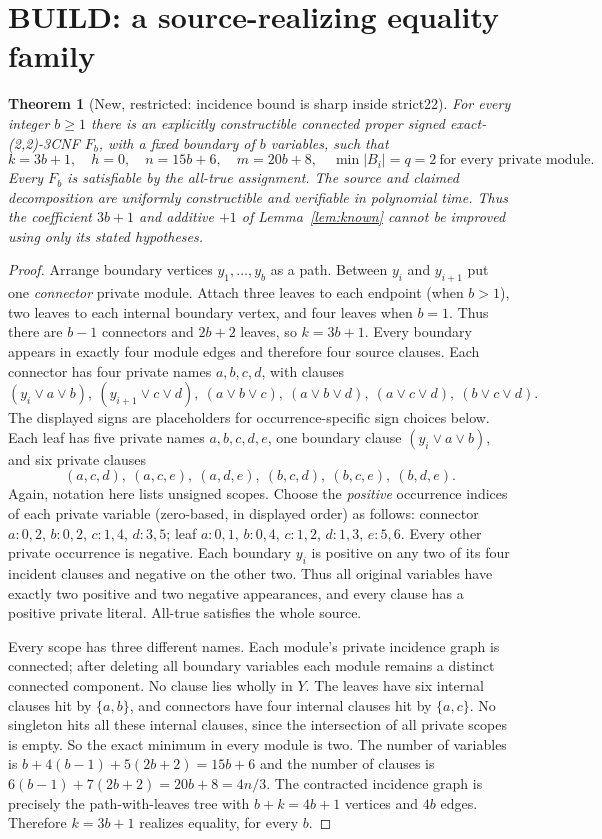 \documentclass[11pt]{article}
\newtheorem{theorem}{Theorem}
\begin{document}
\section{BUILD: a source-realizing equality family}
\begin{theorem}[New, restricted: incidence bound is sharp inside strict22]\label{thm:sharp}
For every integer $b\ge1$ there is an explicitly constructible connected proper signed exact-(2,2)-3CNF $F_b$, with a fixed boundary of $b$ variables, such that
\[
 k=3b+1,\quad h=0,\quad n=15b+6,\quad m=20b+8,
 \quad\min |B_i|=q=2\ \text{for every private module.}\]
Every $F_b$ is satisfiable by the all-true assignment. The source and claimed decomposition are uniformly constructible and verifiable in polynomial time. Thus the coefficient $3b+1$ and additive $+1$ of Lemma~\ref{lem:known} cannot be improved using only its stated hypotheses.
\end{theorem}
\begin{proof}
Arrange boundary vertices $y_1,\ldots,y_b$ as a path. Between $y_i$ and $y_{i+1}$ put one \emph{connector} private module. Attach three leaves to each endpoint (when $b>1$), two leaves to each internal boundary vertex, and four leaves when $b=1$. Thus there are $b-1$ connectors and $2b+2$ leaves, so $k=3b+1$. Every boundary appears in exactly four module edges and therefore four source clauses. Each connector has four private names $a,b,c,d$, with clauses
\[
(y_i\vee a\vee b),\ (y_{i+1}\vee c\vee d),\
(a\vee b\vee c),\ (a\vee b\vee d),\ (a\vee c\vee d),\ (b\vee c\vee d).
\]
The displayed signs are placeholders for occurrence-specific sign choices below. Each leaf has five private names $a,b,c,d,e$, one boundary clause $(y_i\vee a\vee b)$, and six private clauses
\[(a,c,d),\ (a,c,e),\ (a,d,e),\ (b,c,d),\ (b,c,e),\ (b,d,e).\]
Again, notation here lists unsigned scopes. Choose the \emph{positive} occurrence indices of each private variable (zero-based, in displayed order) as follows: connector $a:0,2$, $b:0,2$, $c:1,4$, $d:3,5$; leaf $a:0,1$, $b:0,4$, $c:1,2$, $d:1,3$, $e:5,6$. Every other private occurrence is negative. Each boundary $y_i$ is positive on any two of its four incident clauses and negative on the other two. Thus all original variables have exactly two positive and two negative appearances, and every clause has a positive private literal. All-true satisfies the whole source.

Every scope has three different names. Each module's private incidence graph is connected; after deleting all boundary variables each module remains a distinct connected component. No clause lies wholly in $Y$. The leaves have six internal clauses hit by $\{a,b\}$, and connectors have four internal clauses hit by $\{a,c\}$. No singleton hits all these internal clauses, since the intersection of all private scopes is empty. So the exact minimum in every module is two. The number of variables is $b+4(b-1)+5(2b+2)=15b+6$ and the number of clauses is $6(b-1)+7(2b+2)=20b+8=4n/3$. The contracted incidence graph is precisely the path-with-leaves tree with $b+k=4b+1$ vertices and $4b$ edges. Therefore $k=3b+1$ realizes equality, for every $b$.
\end{proof}
\end{document}
